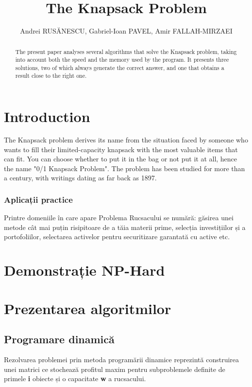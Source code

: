 \documentclass[runningheads]{llncs}
\begin{document}
%
\title{The Knapsack Problem}
%
%
\author{Andrei RUSĂNESCU,
 Gabriel-Ioan PAVEL,
Amir FALLAH-MIRZAEI}
%
%
\maketitle              %
%
\begin{abstract}
The present paper analyses several algorithms that solve the Knapsack problem,
taking into account both the speed and the memory used by the program. It
presents three solutions, two of which always generate the correct answer, and
one that obtains a result close to the right one.

\end{abstract}
%
%
%
\section{Introduction}
The Knapsack problem derives its name from the situation faced by someone who wants
to fill their limited-capacity knapsack with the most valuable items that can fit.
You can choose whether to put it in the bag or not put it at all, hence the name
"0/1 Knapsack Problem". The problem has been studied for more than a century, with
writings dating as far back as 1897. 

\subsubsection{Aplicații practice} Printre domeniile în care apare Problema
Rucsacului se numără: găsirea unei metode cât mai puțin risipitoare de a tăia
materii prime, selecția investițiilor și a portofoliilor, selectarea activelor
pentru securitizare garantată cu active etc.

\section{Demonstrație NP-Hard}

\section{Prezentarea algoritmilor}
\subsection{Programare dinamică}
Rezolvarea problemei prin metoda programării dinamice reprezintă construirea
unei matrici ce stochează profitul maxim pentru subproblemele definite de
primele \textbf{i} obiecte și o capacitate \textbf{w} a rucsacului.
\end{document}
